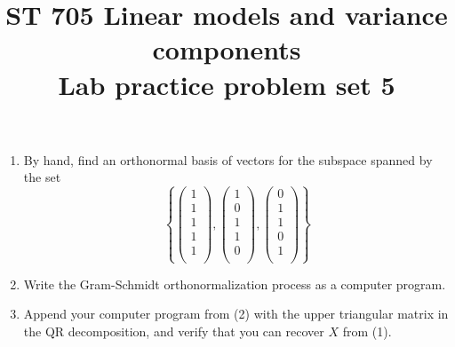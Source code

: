 \documentclass[11pt]{article}
\title{ST 705 Linear models and variance components \\ 
        Lab practice problem set 5}
\begin{document}
\maketitle

\begin{enumerate}

\item By hand, find an orthonormal basis of vectors for the subspace spanned by the set
\[
\left\{
\begin{pmatrix}
1 \\
1 \\
1 \\
1 \\
1 \\
\end{pmatrix},
\begin{pmatrix}
1 \\
0 \\
1 \\
1 \\
0 \\
\end{pmatrix},
\begin{pmatrix}
0 \\
1 \\
1 \\
0 \\
1 \\
\end{pmatrix}
\right\}
\]

\item Write the Gram-Schmidt orthonormalization process as a computer program.

\item Append your computer program from (2) with the upper triangular matrix in the QR decomposition, and verify that you can recover $X$ from (1).

\end{enumerate}
\end{document}
